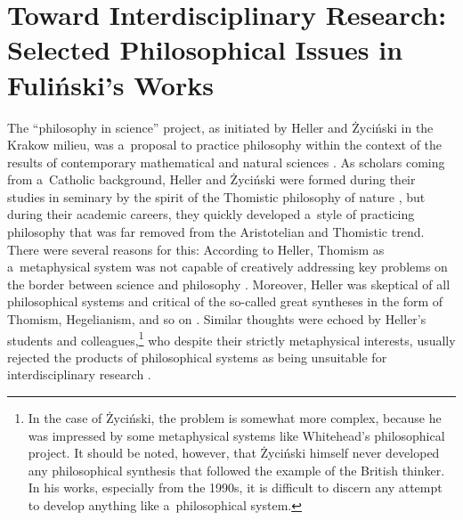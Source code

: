\section{Toward Interdisciplinary Research: Selected Philosophical Issues in Fuliński's Works}

The ``philosophy in science'' project, as initiated by Heller and Życiński in the Krakow milieu, was a~proposal to practice philosophy within the context of the results of contemporary mathematical and natural sciences 
\parencites[][]{heller_how_2019}[][]{polak_philosophy_2019}. %
 As scholars coming from a~Catholic background, Heller and Życiński were formed during their studies in seminary by the spirit of the Thomistic philosophy of nature 
\parencite[e.g][p.107]{heller_wierze_2016}, %
 but during their academic careers, they quickly developed a~style of practicing philosophy that was far removed from the Aristotelian and Thomistic trend. There were several reasons for this: According to Heller, Thomism as a~metaphysical system was not capable of creatively addressing key problems on the border between science and philosophy 
\parencite[][]{janik_nowa_1990}. %
 Moreover, Heller was skeptical of all philosophical systems and critical of the so-called great syntheses in the form of Thomism, Hegelianism, and so on 
\parencites[see e.g][pp.139–146]{heller_filozofia_2004}[][pp.92–95]{}. %
 Similar thoughts were echoed by Heller's students and colleagues,\footnote{In the case of Życiński, the problem is somewhat more complex, because he was impressed by some metaphysical systems like Whitehead's philosophical project. It should be noted, however, that Życiński himself never developed any philosophical synthesis that followed the example of the British thinker. In his works, especially from the 1990s, it is difficult to discern any attempt to develop anything like a~philosophical system.} who despite their strictly metaphysical interests, usually rejected the products of philosophical systems as being unsuitable for interdisciplinary research 
\parencite[see][]{polak_krakow_2022}.%




